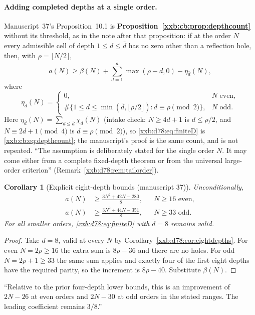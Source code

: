 \documentclass[11pt,a4paper]{article}
\numberwithin{equation}{section}
\newtheorem{corollary}[theorem]{Corollary}
\theoremstyle{definition}
\theoremstyle{remark}
\theoremstyle{plain}
\begin{document}
\paragraph{Adding completed depths at a single order.}  Manuscript~37's
Proposition~10.1 is \textbf{Proposition~\ref{xxb:cb:prop:depthcount}} without
its threshold, as in the note after that proposition: if at the order $N$
every admissible cell of depth $1\le d\le\bar d$ has no zero other than a
reflection hole, then, with $\rho=\lfloor N/2\rfloor$,
\begin{equation}\label{xxb:d78:eq:finiteD}
 a(N)\ge\beta(N)+\sum_{d=1}^{\bar d}\max(\rho-d,0)-\eta_{\bar d}(N),
\end{equation}
where
\[
 \eta_{\bar d}(N)=\begin{cases}0,&N\text{ even},\\
 \#\{1\le d\le\min(\bar d,\lfloor\rho/2\rfloor):d\equiv\rho\pmod 2\},&N\text{ odd}.\end{cases}
\]
Here $\eta_{\bar d}(N)=\sum_{d\le\bar d}\chi_d(N)$ (intake check: $N\ge4d+1$ is
$d\le\rho/2$, and $N\equiv2d+1\pmod4$ is $d\equiv\rho\pmod2$), so
\eqref{xxb:d78:eq:finiteD} is \eqref{xxb:cb:eq:depthcount}; the manuscript's
proof is the same count, and is not repeated.  ``The assumption is
deliberately stated for the single order $N$. It may come either from a
complete fixed-depth theorem or from the universal large-order criterion''
(Remark~\ref{xxb:d78:rem:tailorder}).

\begin{corollary}[Explicit eight-depth bounds (manuscript 37)]\label{xxb:d78:cor:eightcount}
Unconditionally,
\begin{align}
 a(N)&\ge\frac{3N^2+42N-280}{8},&&N\ge16\text{ even},\label{xxb:d78:eq:evenlower}\\
 a(N)&\ge\frac{3N^2+44N-351}{8},&&N\ge33\text{ odd}.\label{xxb:d78:eq:oddlower}
\end{align}
For all smaller orders, \eqref{xxb:d78:eq:finiteD} with $\bar d=8$ remains
valid.
\end{corollary}
\begin{proof}
Take $\bar d=8$, valid at every $N$ by Corollary~\ref{xxb:d78:cor:eightdepths}.
For even $N=2\rho\ge16$ the extra sum is $8\rho-36$ and there are no holes.
For odd $N=2\rho+1\ge33$ the same sum applies and exactly four of the first
eight depths have the required parity, so the increment is $8\rho-40$.
Substitute $\beta(N)$.
\end{proof}
``Relative to the prior four-depth lower bounds, this is an improvement of
$2N-26$ at even orders and $2N-30$ at odd orders in the stated ranges. The
leading coefficient remains $3/8$.''
\end{document}
